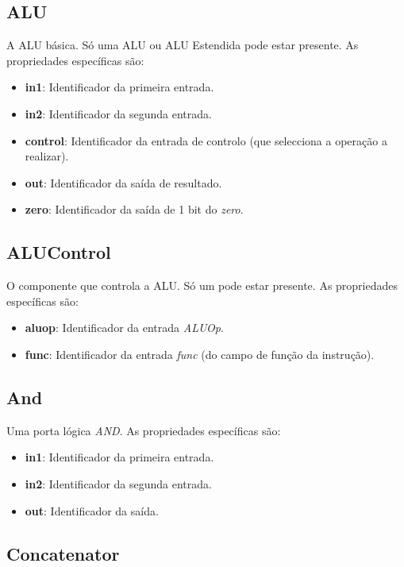 \documentclass[11pt,a4paper,twoside,titlepage]{report}
\begin{document}
\subsection{ALU}

A ALU básica. Só uma ALU ou ALU Estendida pode estar presente. As propriedades
específicas são:
\begin{itemize}
	\item \textbf{in1}: Identificador da primeira entrada.
	\item \textbf{in2}: Identificador da segunda entrada.
	\item \textbf{control}: Identificador da entrada de controlo (que selecciona
		a operação a realizar).
	\item \textbf{out}: Identificador da saída de resultado.
	\item \textbf{zero}: Identificador da saída de 1 bit do \emph{zero}.
\end{itemize}

\subsection{ALUControl}

O componente que controla a ALU. Só um pode estar presente.
As propriedades específicas são:
\begin{itemize}
	\item \textbf{aluop}: Identificador da entrada \emph{ALUOp}.
	\item \textbf{func}: Identificador da entrada \emph{func} (do campo de função
		da instrução).
\end{itemize}

\subsection{And}

Uma porta lógica \emph{AND}. As propriedades específicas são:
\begin{itemize}
	\item \textbf{in1}: Identificador da primeira entrada.
	\item \textbf{in2}: Identificador da segunda entrada.
	\item \textbf{out}: Identificador da saída.
\end{itemize}

\subsection{Concatenator}
\end{document}
